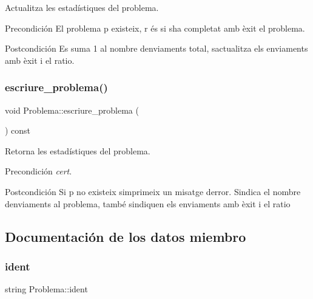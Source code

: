 Actualitza les estadístiques del problema. 

\begin{DoxyPrecond}{Precondición}
El problema p existeix, r és si s\textquotesingle{}ha completat amb èxit el problema. 
\end{DoxyPrecond}
\begin{DoxyPostcond}{Postcondición}
Es suma 1 al nombre d\textquotesingle{}enviaments total, s\textquotesingle{}actualitza els enviaments amb èxit i el ratio. 
\end{DoxyPostcond}
\mbox{\label{class_problema_a6faae2ee8a1812951b22565cc234e8a4}} 
\subsubsection{\texorpdfstring{escriure\+\_\+problema()}{escriure\_problema()}}
{\footnotesize\ttfamily void Problema\+::escriure\+\_\+problema (\begin{DoxyParamCaption}{ }\end{DoxyParamCaption}) const}



Retorna les estadístiques del problema. 

\begin{DoxyPrecond}{Precondición}
{\itshape cert}. 
\end{DoxyPrecond}
\begin{DoxyPostcond}{Postcondición}
Si p no existeix s\textquotesingle{}imprimeix un misatge d\textquotesingle{}error. S\textquotesingle{}indica el nombre d\textquotesingle{}enviaments al problema, també s\textquotesingle{}indiquen els enviaments amb èxit i el ratio 
\end{DoxyPostcond}


\subsection{Documentación de los datos miembro}
\mbox{\label{class_problema_a34d6d89ed0074128dcdf16343d2ab5cd}} 
\subsubsection{\texorpdfstring{ident}{ident}}
{\footnotesize\ttfamily string Problema\+::ident}



